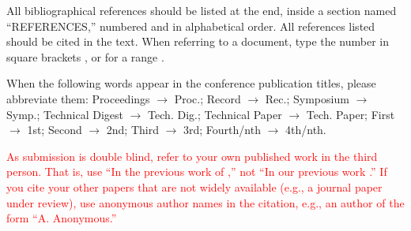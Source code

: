 \documentclass{article}
\begin{document}
All bibliographical references should be listed at the end,
inside a section named ``REFERENCES,'' numbered and in alphabetical order.
All references listed should be cited in the text.
When referring to a document, type the number in square brackets
\cite{Author:00}, or for a range \cite{Author:00,Someone:10,Someone:04}.

When the following words appear in the conference publication titles, please abbreviate them: Proceedings $\rightarrow$ Proc.; Record $\rightarrow$ Rec.; Symposium $\rightarrow$ Symp.; Technical Digest $\rightarrow$ Tech. Dig.; Technical Paper $\rightarrow$ Tech. Paper; First $\rightarrow$ 1st; Second $\rightarrow$ 2nd; Third $\rightarrow$ 3rd; Fourth/nth $\rightarrow$ 4th/nth.

\textcolor{red}{As submission is double blind, refer to your own published work in the third person. That is, use ``In the previous work of \cite{Someone:10},'' not ``In our previous work \cite{Someone:10}.'' If you cite your other papers that are not widely available (e.g., a journal paper under review), use anonymous author names in the citation, e.g., an author of the form ``A. Anonymous.''}



%
%
%
%
\end{document}
